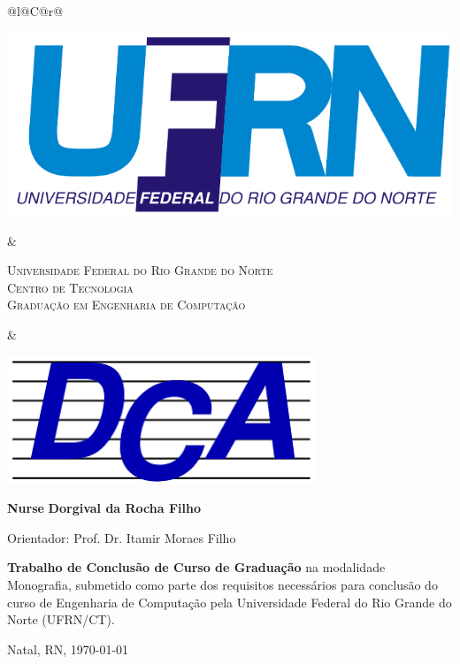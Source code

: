 %
%

\begin{titlepage}

\begin{center}

\small

\begin{tabularx}{\linewidth}{@{}l@{}C@{}r@{}}
\parbox[c]{3cm}{\includegraphics[width=\linewidth]{./figuras/UFRN}} &
\begin{center}
\textsf{\textsc{Universidade Federal do Rio Grande do Norte\\
Centro de Tecnologia\\
Graduação em Engenharia de Computação}}
\end{center} &
\parbox[c]{3cm}{\includegraphics[width=\linewidth]{./figuras/dca_logo.png}}
\end{tabularx}

\vfill
\LARGE
\textbf{Nurse}
\vfill
\Large
\textbf{Dorgival da Rocha Filho}
\vfill

\normalsize

Orientador: Prof. Dr. Itamir Moraes Filho

\vfill

\hfill
\parbox{0.5\linewidth}{\textbf{%
Trabalho de Conclusão de Curso de Graduação} na modalidade Monografia, 
submetido como parte dos requisitos necessários para 
conclusão do curso de Engenharia de Computação pela 
Universidade Federal do Rio Grande do Norte (UFRN/CT).
}

\vfill

\large

Natal, RN, \today

\end{center}

\end{titlepage}
